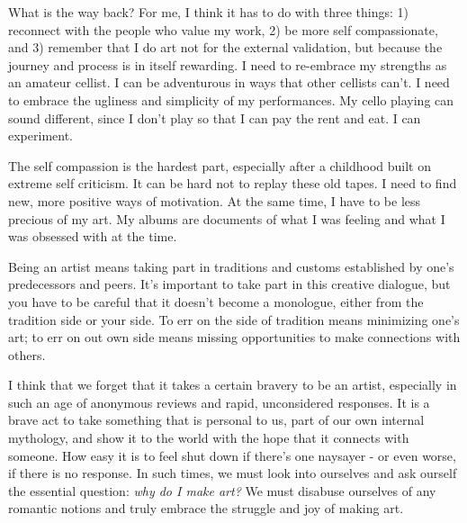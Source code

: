 \documentclass[
]{book}
\begin{document}
What is the way back? For me, I think it has to do with three things: 1) reconnect with the people who value my work, 2) be more self compassionate, and 3) remember that I do art not for the external validation, but because the journey and process is in itself rewarding. I need to re-embrace my strengths as an amateur cellist. I can be adventurous in ways that other cellists can't. I need to embrace the ugliness and simplicity of my performances. My cello playing can sound different, since I don't play so that I can pay the rent and eat. I can experiment.

The self compassion is the hardest part, especially after a childhood built on extreme self criticism. It can be hard not to replay these old tapes. I need to find new, more positive ways of motivation. At the same time, I have to be less precious of my art. My albums are documents of what I was feeling and what I was obsessed with at the time.

Being an artist means taking part in traditions and customs established by one's predecessors and peers. It's important to take part in this creative dialogue, but you have to be careful that it doesn't become a monologue, either from the tradition side or your side. To err on the side of tradition means minimizing one's art; to err on out own side means missing opportunities to make connections with others.

I think that we forget that it takes a certain bravery to be an artist, especially in such an age of anonymous reviews and rapid, unconsidered responses. It is a brave act to take something that is personal to us, part of our own internal mythology, and show it to the world with the hope that it connects with someone. How easy it is to feel shut down if there's one naysayer - or even worse, if there is no response. In such times, we must look into ourselves and ask ourself the essential question: \emph{why do I make art?} We must disabuse ourselves of any romantic notions and truly embrace the struggle and joy of making art.
\end{document}
